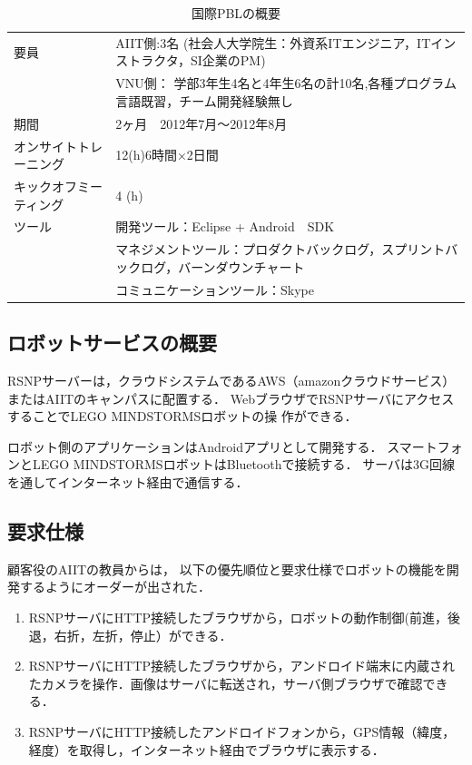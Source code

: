 \documentclass[a4j, 12Q, twocolumn, twoside]{jsarticle}
\begin{document}
\begin{table}
  \caption{国際PBLの概要}
  \begin{center}
   \small
    \begin{tabular}{|p{}|p{}|}
      \hline
      要員 & AIIT側:3名 (社会人大学院生：外資系ITエンジニア，ITインストラクタ，SI企業のPM) \\
       &VNU側： 学部3年生4名と4年生6名の計10名,各種プログラム言語既習，チーム開発経験無し \\      \hline
      期間 &2ヶ月　2012年7月～2012年8月 \\      \hline
       オンサイトトレーニング & 12(h)6時間×2日間\\      \hline
      キックオフミーティング &4 (h) \\      \hline
            ツール &開発ツール：Eclipse + Android　SDK\\
& マネジメントツール：プロダクトバックログ，スプリントバックログ，バーンダウンチャート\\
&コミュニケーションツール：Skype\\
      \hline
    \end{tabular}
     \label{tab:GlobalPBL}
  \end{center}
\end{table}


\subsection{ロボットサービスの概要}
RSNPサーバーは，クラウドシステムであるAWS（amazonクラウドサービス）またはAIITのキャンパスに配置する．
WebブラウザでRSNPサーバにアクセスすることでLEGO MINDSTORMSロボットの操
作ができる．

ロボット側のアプリケーションはAndroidアプリとして開発する．
スマートフォンとLEGO MINDSTORMSロボットはBluetoothで接続する．
サーバは3G回線を通してインターネット経由で通信する．

\subsection{要求仕様}
顧客役のAIITの教員からは，
以下の優先順位と要求仕様でロボットの機能を開発するようにオーダーが出された．
\begin{enumerate}
\item RSNPサーバにHTTP接続したブラウザから，ロボットの動作制御(前進，後退，右折，左折，停止）ができる．
\item RSNPサーバにHTTP接続したブラウザから，アンドロイド端末に内蔵されたカメラを操作．画像はサーバに転送され，サーバ側ブラウザで確認できる．
\item RSNPサーバにHTTP接続したアンドロイドフォンから，GPS情報（緯度，経度）を取得し，インターネット経由でブラウザに表示する．
\end{enumerate}
\end{document}
